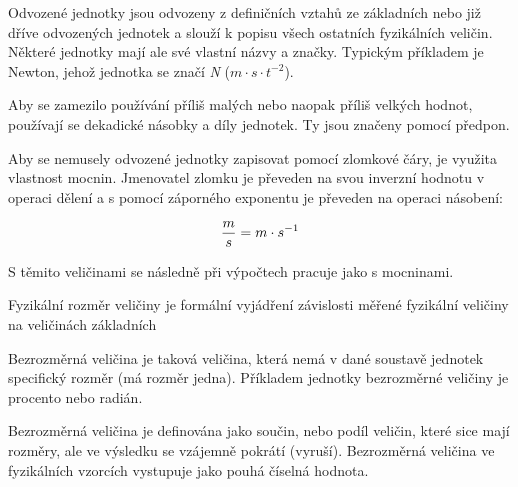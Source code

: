 \vskip 4mm

\odradkovat
{}\odradkovat
{}\odradkovat
{}\odradkovat
{}\odradkovat
{}\odradkovat
{}\odradkovat

\vskip 4mm

Odvozené jednotky jsou odvozeny z definičních vztahů ze základních nebo již dříve odvozených jednotek a slouží k popisu všech ostatních fyzikálních veličin. Některé jednotky mají ale své vlastní názvy a značky. Typickým příkladem je Newton, jehož jednotka se značí {\it N} ($m \cdot s \cdot t^{-2} $).

Aby se zamezilo používání příliš malých nebo naopak příliš velkých hodnot, používají se dekadické násobky a díly jednotek. Ty jsou značeny pomocí předpon.

Aby se nemusely odvozené jednotky zapisovat pomocí zlomkové čáry, je využita vlastnost mocnin. Jmenovatel zlomku je převeden na svou inverzní hodnotu v operaci dělení a s pomocí záporného exponentu je převeden na operaci násobení:

$$ {m \over s} = m \cdot s^{-1}$$

S těmito veličinami se následně při výpočtech pracuje jako s mocninami.


Fyzikální rozměr veličiny je formální vyjádření závislosti měřené fyzikální veličiny na veličinách základních 



Bezrozměrná veličina je taková veličina, která nemá v dané soustavě jednotek specifický rozměr (má rozměr jedna). Příkladem jednotky bezrozměrné veličiny je procento nebo radián. 

Bezrozměrná veličina je definována jako součin, nebo podíl veličin, které sice mají rozměry, ale ve výsledku se vzájemně pokrátí (vyruší). Bezrozměrná veličina ve fyzikálních vzorcích vystupuje jako pouhá číselná hodnota.



